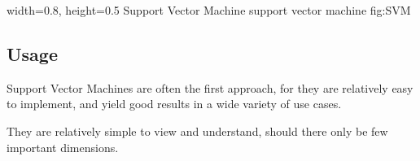     {width=0.8\textwidth, height=0.5\textheight} %
    {Support Vector Machine}   %
    {support vector machine}   %
    {fig:SVM}    %

\subsection{Usage}
Support Vector Machines are often the first approach, for they are relatively easy to implement, and yield good results in a wide variety of use cases. 

They are relatively simple to view and understand, should there only be few important dimensions.

